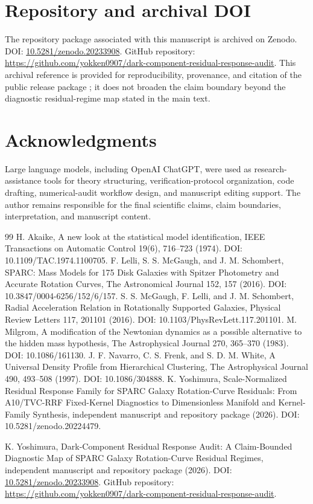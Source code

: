 \documentclass[11pt,a4paper]{article}
\begin{document}
\section*{Repository and archival DOI}
\sloppy
The repository package associated with this manuscript is archived on Zenodo. DOI: \href{https://doi.org/10.5281/zenodo.20233908}{10.5281/zenodo.20233908}. GitHub repository: \url{https://github.com/yokken0907/dark-component-residual-response-audit}. This archival reference is provided for reproducibility, provenance, and citation of the public release package \cite{yoshimura2026dcrra}; it does not broaden the claim boundary beyond the diagnostic residual-regime map stated in the main text.
\fussy

\section*{Acknowledgments}
Large language models, including OpenAI ChatGPT, were used as research-assistance tools for theory structuring, verification-protocol organization, code drafting, numerical-audit workflow design, and manuscript editing support. The author remains responsible for the final scientific claims, claim boundaries, interpretation, and manuscript content.

\begin{thebibliography}{99}
 H. Akaike, A new look at the statistical model identification, IEEE Transactions on Automatic Control 19(6), 716--723 (1974). DOI: 10.1109/TAC.1974.1100705.
 F. Lelli, S. S. McGaugh, and J. M. Schombert, SPARC: Mass Models for 175 Disk Galaxies with Spitzer Photometry and Accurate Rotation Curves, The Astronomical Journal 152, 157 (2016). DOI: 10.3847/0004-6256/152/6/157.
 S. S. McGaugh, F. Lelli, and J. M. Schombert, Radial Acceleration Relation in Rotationally Supported Galaxies, Physical Review Letters 117, 201101 (2016). DOI: 10.1103/PhysRevLett.117.201101.
 M. Milgrom, A modification of the Newtonian dynamics as a possible alternative to the hidden mass hypothesis, The Astrophysical Journal 270, 365--370 (1983). DOI: 10.1086/161130.
 J. F. Navarro, C. S. Frenk, and S. D. M. White, A Universal Density Profile from Hierarchical Clustering, The Astrophysical Journal 490, 493--508 (1997). DOI: 10.1086/304888.
 K. Yoshimura, Scale-Normalized Residual Response Family for SPARC Galaxy Rotation-Curve Residuals: From A10/TVC-RRF Fixed-Kernel Diagnostics to Dimensionless Manifold and Kernel-Family Synthesis, independent manuscript and repository package (2026). DOI: 10.5281/zenodo.20224479.

 K. Yoshimura, Dark-Component Residual Response Audit: A Claim-Bounded Diagnostic Map of SPARC Galaxy Rotation-Curve Residual Regimes, independent manuscript and repository package (2026). DOI: \href{https://doi.org/10.5281/zenodo.20233908}{10.5281/zenodo.20233908}. GitHub repository: \url{https://github.com/yokken0907/dark-component-residual-response-audit}.

\end{thebibliography}
\end{document}
